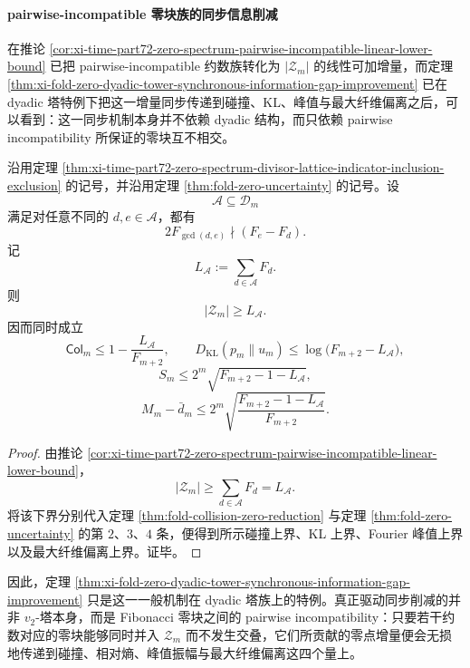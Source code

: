 \paragraph{pairwise-incompatible 零块族的同步信息削减}
在推论 \ref{cor:xi-time-part72-zero-spectrum-pairwise-incompatible-linear-lower-bound} 已把 pairwise-incompatible 约数族转化为 \(|\mathcal Z_m|\) 的线性可加增量，而定理 \ref{thm:xi-fold-zero-dyadic-tower-synchronous-information-gap-improvement} 已在 dyadic 塔特例下把这一增量同步传递到碰撞、KL、峰值与最大纤维偏离之后，可以看到：这一同步机制本身并不依赖 dyadic 结构，而只依赖 pairwise incompatibility 所保证的零块互不相交。

\begin{theorem}\label{thm:xi-time-part72b-pairwise-incompatible-synchronous-information-gap}
沿用定理 \ref{thm:xi-time-part72-zero-spectrum-divisor-lattice-indicator-inclusion-exclusion} 的记号，并沿用定理 \ref{thm:fold-zero-uncertainty} 的记号。设
\[
\mathcal A\subseteq \mathcal D_m
\]
满足对任意不同的 \(d,e\in\mathcal A\)，都有
\[
2F_{\gcd(d,e)}\nmid (F_e-F_d).
\]
记
\[
L_{\mathcal A}:=\sum_{d\in\mathcal A}F_d.
\]
则
\[
|\mathcal Z_m|\ge L_{\mathcal A}.
\]
因而同时成立
\[
\mathsf{Col}_m
\le
1-\frac{L_{\mathcal A}}{F_{m+2}},
\qquad
D_{\mathrm{KL}}(p_m\|u_m)
\le
\log\!\bigl(F_{m+2}-L_{\mathcal A}\bigr),
\]
\[
S_m\le 2^m\sqrt{F_{m+2}-1-L_{\mathcal A}},
\]
\[
M_m-\bar d_m
\le
2^m\sqrt{\frac{F_{m+2}-1-L_{\mathcal A}}{F_{m+2}}}.
\]
\end{theorem}
\begin{proof}
由推论 \ref{cor:xi-time-part72-zero-spectrum-pairwise-incompatible-linear-lower-bound}，
\[
|\mathcal Z_m|\ge \sum_{d\in\mathcal A}F_d=L_{\mathcal A}.
\]
将该下界分别代入定理 \ref{thm:fold-collision-zero-reduction} 与定理
\ref{thm:fold-zero-uncertainty} 的第 \(2\)、\(3\)、\(4\) 条，便得到所示碰撞上界、KL 上界、Fourier 峰值上界以及最大纤维偏离上界。证毕。
\end{proof}

\noindent
因此，定理 \ref{thm:xi-fold-zero-dyadic-tower-synchronous-information-gap-improvement} 只是这一一般机制在 dyadic 塔族上的特例。真正驱动同步削减的并非 \(v_2\)-塔本身，而是 Fibonacci 零块之间的 pairwise incompatibility：只要若干约数对应的零块能够同时并入 \(\mathcal Z_m\) 而不发生交叠，它们所贡献的零点增量便会无损地传递到碰撞、相对熵、峰值振幅与最大纤维偏离这四个量上。

\endinput
